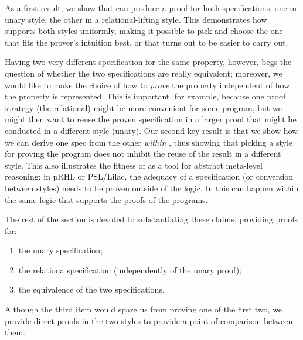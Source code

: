 \medskip
As a first result, we show that \thelogic{} can produce a proof for both specifications, one in unary style, the other in a relational-lifting style.
This demonstrates how \thelogic{} supports both styles uniformly,
making it possible to pick and choose the one that fits the prover's intuition
best, or that turns out to be easier to carry out.

Having two very different specification for the same property,
however, begs the question of whether the two specifications are really
equivalent; moreover, we would like to make the choice of how to \emph{prove}
the property independent of how the property is represented.
This is important, for example, because one proof strategy (\eg the relational)
might be more convenient for some program, but we might then want to reuse
the proven specification in a larger proof that might be conducted in a different style (\eg unary).
Our second key result is that we show how we can derive one spec from the other
\emph{within} \thelogic{}, thus showing that picking a style for proving the program does not inhibit the reuse of the result in a different style.
This also illustrates the fitness of \thelogic{} as a tool for abstract
meta-level reasoning:
in pRHL or PSL/Lilac,
the adequacy of a specification (or conversion between styles)
needs to be proven outside of the logic.
In \thelogic{} this can happen within the same logic that supports the proofs of the programs.

The rest of the section is devoted to substantiating these claims,
providing \thelogic{} proofs for:
\begin{enumerate}
  \item the unary specification;
  \item the relationa specification (independently of the unary proof);
  \item the equivalence of the two specifications.
\end{enumerate}
Although the third item would spare us from proving one of the first two,
we provide direct proofs in the two styles to provide a point of comparison
between them.


